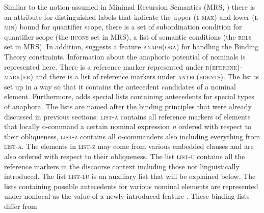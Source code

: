 \documentclass[output=paper
	        ,collection
	        ,collectionchapter
 	        ,biblatex
                ,babelshorthands
                ,newtxmath
                ,draftmode
                ,colorlinks, citecolor=brown
]{langscibook}
\begin{document}
Similar to the notion assumed in Minimal Recursion Semantics (MRS, \citealp*{CFPS2005a}) there is an
attribute for distinguished labels that indicate the upper (\textsc{l-max}) and lower
(\textsc{l-min}) bound for quantifier scope, there is a set of subordination condition for
quantifier scope (the \textsc{hcons} set in MRS), a list of semantic conditions (the \textsc{rels}
set in MRS). In addition, \citeauthor{Branco2002a} suggests a feature \textsc{anaph(ora)} for handling
the Binding Theory constraints. Information about the anaphoric potential of nominals is represented
here. There is a reference marker represented under \textsc{r(eferene)-mark(er)} and there is a list
of reference markers under \textsc{antec(edents)}. The list is set up in a way so that it contains
the antecedent candidates of a nominal element. Furthermore, \citeauthor{Branco2002a} adds special
lists containing antecedents for special types of anaphora. The lists are named after the binding
principles that were already discussed in previous sections: \textsc{list-a} contains all reference
markers of elements that locally o-command a certain nominal expression \emph{n} ordered with
respect to their obliqueness, \textsc{list-z} contains all o-commanders also including everything
from \textsc{list-a}. The elements in \textsc{list-z} may come from various
embedded clauses and are also ordered with respect to their obliqueness. The list \textsc{list-u}
contains all the reference markers in the discourse context including those not linguistically
introduced. The list \textsc{list-lu} is an auxiliary list that will be explained below.
\ea
{}
\z
The lists containing possible antecedents for various nominal elements are represented under
nonlocal as the value of a newly introduced feature . These binding lists differ from
\end{document}
